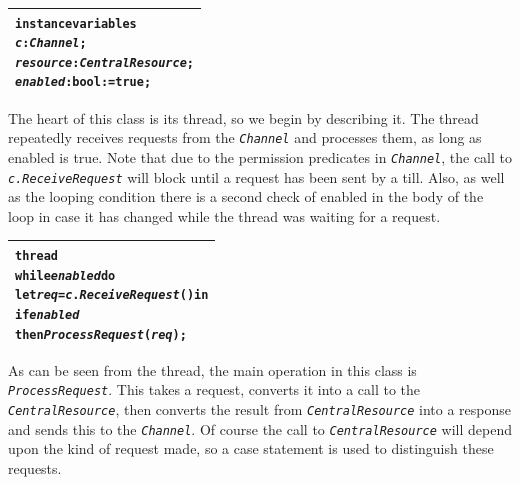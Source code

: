 \documentclass[\pformat,12pt,twoside]{article}
\newenvironment{VDMgray}%
{\begin{tabular}{|G|}\hline\small\begin{alltt}}%
{\end{alltt}\normalsize\\
 \hline\end{tabular}}
\begin{document}
\begin{VDMgray}
\textbf{instance} \textbf{variables}
 \textit{c}: \textit{Channel};
 \textit{resource} : \textit{CentralResource};
 \textit{enabled} : \textbf{bool} := \textbf{true};
\end{VDMgray}


The heart of this class is its thread, so we begin by describing 
it. The thread repeatedly receives requests from the \texttt{\emph{Channel}} 
and processes them, as long as enabled is true. Note that due 
to the permission predicates in \texttt{\emph{Channel}}, the call to \texttt{\emph{c.ReceiveRequest}} 
will block until a request has been sent by a till. Also, as 
well as the looping condition there is a second check of enabled 
in the body of the loop in case it has changed while the thread 
was waiting for a request.

\begin{VDMgray}
\textbf{thread}
 \textbf{while} \textit{enabled} \textbf{do}
 \textbf{let} \textit{req} = \textit{c}.\textit{ReceiveRequest}() \textbf{in}
   \textbf{if} \textit{enabled}
   \textbf{then} \textit{ProcessRequest}(\textit{req});
\end{VDMgray}


As can be seen from the thread, the main operation in this class is
\texttt{\emph{ProcessRequest}}. This takes a request, converts it into
a call to the \texttt{\emph{CentralResource}}, then converts the
result from \texttt{\emph{CentralResource}} into a response and sends
this to the \texttt{\emph{Channel}}. Of course the call to
\texttt{\emph{CentralResource}} will depend upon the kind of request
made, so a case statement is used to distinguish these requests.
\end{document}
